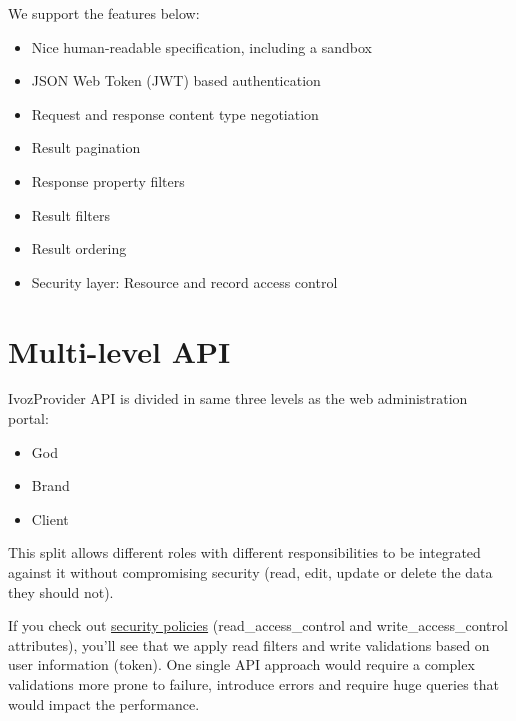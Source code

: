 \documentclass[letterpaper,10pt,english]{sphinxmanual}
\begin{document}
We support the features below:
\begin{itemize}
\item {} 
Nice human-readable specification, including a sandbox

\item {} 
JSON Web Token (JWT) based authentication

\item {} 
Request and response content type negotiation

\item {} 
Result pagination

\item {} 
Response property filters

\item {} 
Result filters

\item {} 
Result ordering

\item {} 
Security layer: Resource and record access control

\end{itemize}


\chapter{Multi-level API}
\label{api_rest/multilevel::doc}\label{api_rest/multilevel:multi-level-api}
IvozProvider API is divided in same three levels as the web administration portal:
\begin{itemize}
\item {} 
God

\item {} 
Brand

\item {} 
Client

\end{itemize}

This split allows different roles with different responsibilities to be integrated against it without compromising
security (read, edit, update or delete the data they should not).

If you check out \href{https://github.com/irontec/ivozprovider/blob/bleeding/web/rest/brand/config/api/raw/provider.yml}{security policies}
(read\_access\_control and write\_access\_control attributes), you’ll see that we apply
read filters and write validations based on user information (token). One single API approach would require a complex
validations more prone to failure, introduce errors and require huge queries that would impact the performance.
\end{document}
